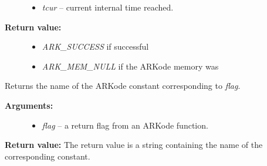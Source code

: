 \documentclass[letterpaper,10pt,english]{sphinxmanual}
\begin{document}
\begin{fulllineitems}
\begin{description}
\begin{itemize}
\item {} 
\emph{tcur} -- current internal time reached.

\end{itemize}

\item[{\textbf{Return value:}}] \leavevmode\begin{itemize}
\item {} 
\emph{ARK\_SUCCESS} if successful

\item {} 
\emph{ARK\_MEM\_NULL} if the ARKode memory was 

\end{itemize}

\end{description}

\end{fulllineitems}


\begin{fulllineitems}
\label{c_interface/User_callable:ARKodeGetReturnFlagName}
Returns the name of the ARKode constant corresponding to \emph{flag}.
\begin{description}
\item[{\textbf{Arguments:}}] \leavevmode\begin{itemize}
\item {} 
\emph{flag} -- a return flag from an ARKode function.

\end{itemize}

\end{description}

\textbf{Return value:}
The return value is a string containing the name of
the corresponding constant.

\end{fulllineitems}
\end{document}

